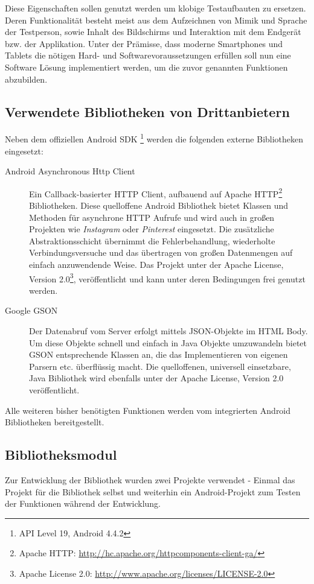 Diese Eigenschaften sollen genutzt werden um klobige Testaufbauten zu ersetzen. Deren Funktionalität besteht meist aus dem Aufzeichnen von Mimik und Sprache der Testperson, sowie Inhalt des Bildschirms und Interaktion mit dem Endgerät bzw. der Applikation.
Unter der Prämisse, dass moderne Smartphones und Tablets die nötigen Hard- und Softwarevoraussetzungen erfüllen soll nun eine Software Lösung implementiert werden, um die zuvor genannten Funktionen abzubilden.


\subsection{Verwendete Bibliotheken von Drittanbietern}
Neben dem offiziellen Android SDK \footnote{API Level 19, Android 4.4.2} werden die folgenden externe Bibliotheken eingesetzt:
\begin{description}
	\item[Android Asynchronous Http Client\footnotemark]  
	Ein Callback-basierter HTTP Client, aufbauend auf Apache HTTP\footnote{Apache HTTP: \url{http://hc.apache.org/httpcomponents-client-ga/}} Bibliotheken. Diese quelloffene Android Bibliothek bietet Klassen und Methoden für asynchrone HTTP Aufrufe und wird auch in großen Projekten wie \emph{Instagram} oder \emph{Pinterest} eingesetzt. Die zusätzliche Abstraktionsschicht übernimmt die Fehlerbehandlung, wiederholte Verbindungsversuche und das übertragen von großen Datenmengen auf einfach anzuwendende Weise. Das Projekt unter der Apache License, Version 2.0\footnote{Apache License 2.0: \label{ftn:apache_license} \url{http://www.apache.org/licenses/LICENSE-2.0}}, veröffentlicht und kann unter deren Bedingungen frei genutzt werden.
	\item[Google GSON\footnotemark] 
	Der Datenabruf vom Server erfolgt mittels \ac{JSON}-Objekte im HTML Body. Um diese Objekte schnell und einfach in Java Objekte umzuwandeln bietet GSON entsprechende Klassen an, die das Implementieren von eigenen Parsern etc. überflüssig macht.
	Die quelloffenen, universell einsetzbare, Java Bibliothek wird ebenfalls unter der Apache License, Version 2.0 veröffentlicht.
\end{description}
Alle weiteren bisher benötigten Funktionen werden vom integrierten Android Bibliotheken bereitgestellt.

\subsection{Bibliotheksmodul}
Zur Entwicklung der Bibliothek wurden zwei Projekte verwendet - Einmal das Projekt für die Bibliothek selbst und weiterhin ein Android-Projekt zum Testen der Funktionen während der Entwicklung. 


